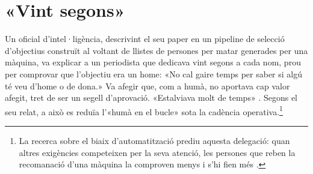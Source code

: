 \chapter{«Vint segons»}
\label{sec:1}
Un oficial d'intel·ligència, descrivint el seu paper en un pipeline de selecció d'objectius construït al voltant de llistes de persones per matar generades per una màquina, va explicar a un periodista que dedicava vint segons a cada nom, prou per comprovar que l'objectiu era un home: «No cal gaire temps per saber si algú té veu d'home o de dona.» Va afegir que, com a humà, no aportava cap valor afegit, tret de ser un segell d'aprovació. «Estalviava molt de temps» \autocite{abraham2024lavender}. Segons el seu relat, a això es reduïa l'«humà en el bucle» sota la cadència operativa.\footnote{La recerca sobre el biaix d'automatització prediu aquesta delegació: quan altres exigències competeixen per la seva atenció, les persones que reben la recomanació d'una màquina la comproven menys i s'hi fien més \autocite{parasuraman2010complacency}.}

